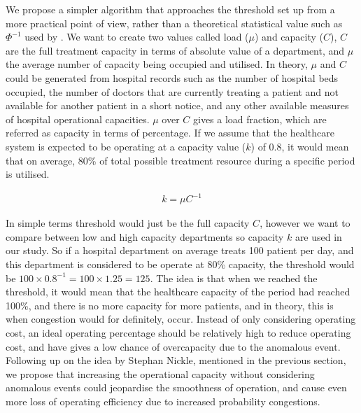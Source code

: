 We propose a simpler algorithm that approaches the threshold set up from a more practical point of view, rather than a theoretical statistical value such as $\Phi^{-1}$ used by \citet{wong2003bayesian}. We want to create two values called load ($\mu$) and capacity ($C$), $C$ are the full treatment capacity in terms of absolute value of a department, and $\mu$ the average number of capacity being occupied and utilised. In theory, $\mu$ and $C$ could be generated from hospital records such as the number of hospital beds occupied, the number of doctors that are currently treating a patient and not available for another patient in a short notice, and any other available measures of hospital operational capacities. $\mu$ over $C$ gives a load fraction, which are referred as capacity in terms of percentage. If we assume that the healthcare system is expected to be operating at a capacity value ($k$) of 0.8, it would mean that on average, 80\% of total possible treatment resource during a specific period is utilised. 

\begin{equation}\label{equ:threshold2}
\begin{aligned}
k = \mu C^{-1}
\end{aligned}
\end{equation}

In simple terms threshold would just be the full capacity $C$, however we want to compare between low and high capacity departments so capacity $k$ are used in our study. So if a hospital department on average treats 100 patient per day, and this department is considered to be operate at 80\% capacity, the threshold would be $100 \times 0.8^{-1} = 100 \times 1.25 = 125$. The idea is that when we reached the threshold, it would mean that the healthcare capacity of the period had reached 100\%, and there is no more capacity for more patients, and in theory, this is when congestion would for definitely, occur. Instead of only considering operating cost, an ideal operating percentage should be relatively high to reduce operating cost, and have gives a low chance of overcapacity due to the anomalous event. Following up on the idea by Stephan Nickle, mentioned in the previous section, we propose that increasing the operational capacity without considering anomalous events could jeopardise the smoothness of operation, and cause even more loss of operating efficiency due to increased probability congestions. 

\newpara

